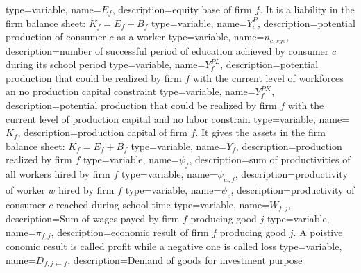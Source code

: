 {%
  type=variable,%
  name={$E_{f}$},%
  description={equity base of firm $f$. It is a liability in the firm balance sheet: $K_f=E_f+B_f$} 
}
{%
  type=variable,%
  name={$Y^{P}_{c}$},%
  description={potential production of consumer $c$ as a worker} 
}
{%
  type=variable,%
  name={$n_{c,sye}$},%
  description={number of successful period of education achieved by consumer $c$ during its school period} 
}
{%
  type=variable,%
  name={$Y^{PL}_{f}$},%
  description={potential production that could be realized by firm $f$ with the current level of workforces an no production capital constraint} 
}
{%
  type=variable,%
  name={$Y^{PK}_{f}$},%
  description={potential production that could be realized by firm $f$ with the current level of production capital and no labor constrain} 
}
{%
  type=variable,%
  name={$K_{f}$},%
  description={production capital of firm $f$. It gives the assets in the firm balance sheet: $K_f=E_f+B_f$} 
}
{%
  type=variable,%
  name={$Y_{f}$},%
  description={production realized by firm $f$} 
}
{%
  type=variable,%
  name={$\psi_{f}$},%
  description={sum of productivities of all workers hired by firm $f$} 
}
{%
  type=variable,%
  name={$\psi_{w,f}$},%
  description={productivity of worker $w$ hired by firm $f$} 
}
{%
  type=variable,%
  name={$\psi_{c}$},%
  description={productivity of consumer $c$ reached during school time} 
}
{%
  type=variable,%
  name={$W_{f,j}$},%
  description={Sum of wages payed by firm $f$ producing good $j$} 
}
{%
  type=variable,%
  name={$\pi_{f,j}$},%
  description={economic result of firm $f$ producing good $j$. A poistive conomic result is called profit while a negative one is called loss} 
}
{%
  type=variable,%
  name={$D_{f,j\leftarrow f}$},%
  description={Demand of goods for investment purpose} 
}
